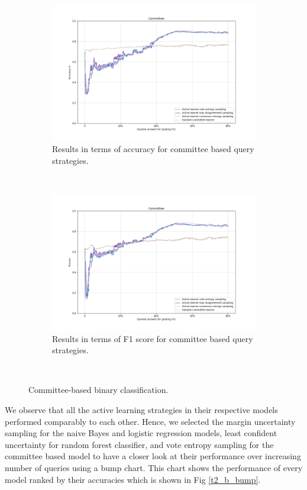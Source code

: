  
 \begin{figure}[!htb]
 	\begin{subfigure}[b]{0.5\textwidth}
 		\includegraphics[width=\textwidth]{images/binary/task2_accuracy_com}
 		\caption{Results in terms of accuracy for committee based query strategies.}
 		\label{t2_b_com}
 	\end{subfigure}
 	~
 	\begin{subfigure}[b]{0.5\textwidth}
 		\includegraphics[width=\textwidth]{images/binary/task2_f1score_com}
 		\caption{Results in terms of F1 score for committee based query strategies.}
 		\label{t2_b_com_f1}
 	\end{subfigure}
 	~
 	\caption{Committee-based binary classification.}
 \end{figure}
 
 We observe that all the active learning strategies in their respective models performed comparably to each other. Hence, we selected the margin uncertainty sampling for the naive Bayes and logistic regression models, least confident uncertainty for random forest classifier, and vote entropy sampling for the committee based model to have a closer look at their performance over increasing number of queries using a bump chart. This chart shows the performance of every model ranked by their accuracies which is shown in Fig \ref{t2_b_bump}.
 
